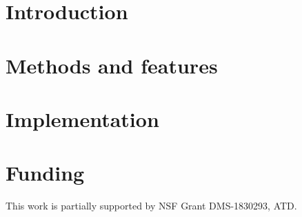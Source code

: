 \documentclass{bioinfo}
\begin{document}
\section{Introduction}
\label{sec:intro}


\vspace*{-16pt}
\section{Methods and features}
\label{sec:results}


\vspace*{-16pt}
\section{Implementation}
\label{sec:implementaion}


% 

\vspace*{-16pt}
\section*{Funding}

This work is partially supported by NSF Grant DMS-1830293, ATD.
\vspace*{-16pt}

%
%
%
%
%
%
%
%
%
\end{document}
